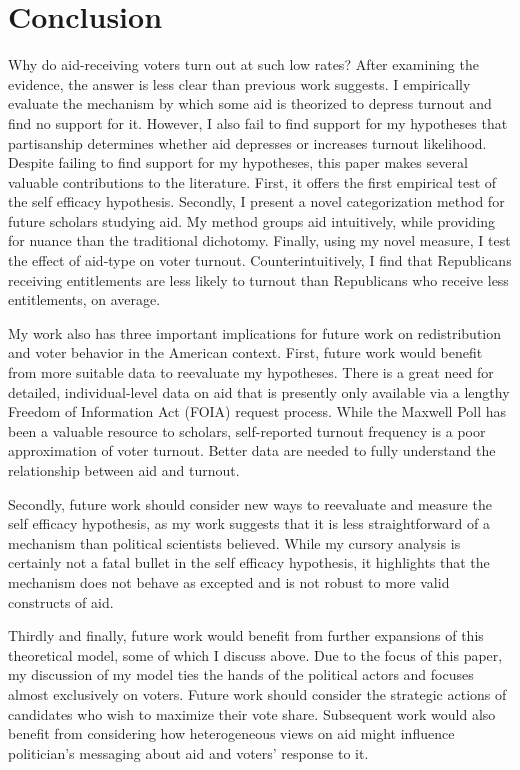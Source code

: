 \documentclass[12pt]{paper}
\begin{document}
\section{Conclusion}
Why do aid-receiving voters turn out at such low rates? After examining the evidence, the answer is less clear than previous work suggests. I empirically evaluate the mechanism by which some aid is theorized to depress turnout and find no support for it. However, I also fail to find support for my hypotheses that partisanship determines whether aid depresses or increases turnout likelihood. Despite failing to find support for my hypotheses, this paper makes several valuable contributions to the literature. First, it offers the first empirical test of the self efficacy hypothesis. Secondly, I present a novel categorization method for future scholars studying aid. My method groups aid intuitively, while providing for nuance than the traditional dichotomy. Finally, using my novel measure, I test the effect of aid-type on voter turnout. Counterintuitively, I find that Republicans receiving entitlements are less likely to turnout than Republicans who receive less entitlements, on average.

My work also has three important implications for future work on redistribution and voter behavior in the American context. First, future work would benefit from more suitable data to reevaluate my hypotheses. There is a great need for detailed, individual-level data on aid that is presently only available via a lengthy Freedom of Information Act (FOIA) request process. While the Maxwell Poll has been a valuable resource to scholars, self-reported turnout frequency is a poor approximation of voter turnout. Better data are needed to fully understand the relationship between aid and turnout.

Secondly, future work should consider new ways to reevaluate and measure the self efficacy hypothesis, as my work suggests that it is less straightforward of a mechanism than political scientists believed. While my cursory analysis is certainly not a fatal bullet in the self efficacy hypothesis, it highlights that the mechanism does not behave as excepted and is not robust to more valid constructs of aid.

Thirdly and finally, future work would benefit from further expansions of this theoretical model, some of which I discuss above. Due to the focus of this paper, my discussion of my model ties the hands of the political actors and focuses almost exclusively on voters. Future work should consider the strategic actions of candidates who wish to maximize their vote share. Subsequent work would also benefit from considering how heterogeneous views on aid might influence politician's messaging about aid and voters' response to it.
%
%
\end{document}
